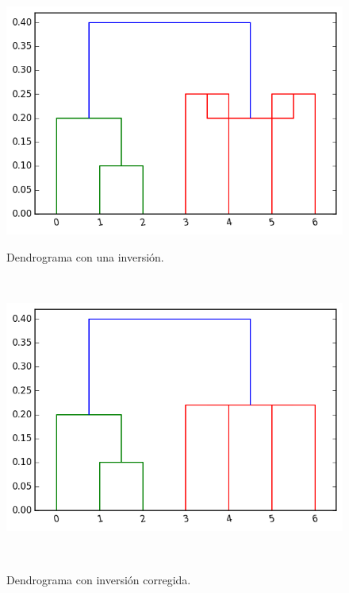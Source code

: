 \begin{figure}[h!]
                                                                                                                        
\begin{minipage}[b]{0.49\textwidth}
    \includegraphics[width=\textwidth]{img/inversion_0.png}
    \caption{\small Dendrograma con una inversi\'on.}
     \label{fig:inversion}
\end{minipage} ~
\hfill
\begin{minipage}[b]{0.49\textwidth}
    \includegraphics[width=\textwidth]{img/inversion_1.png}
    \caption{\small Dendrograma con inversi\'on corregida. }
    \label{fig:no_inversion}
\end{minipage} ~

\end{figure}  

